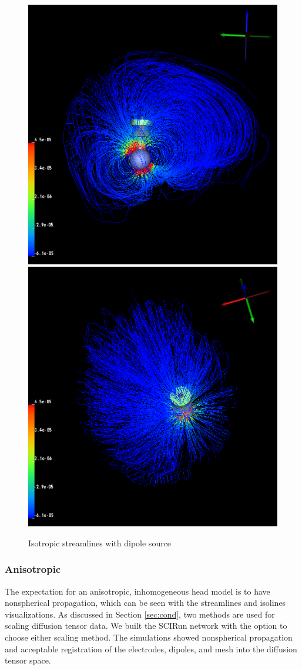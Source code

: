 \begin{figure}[H]
\begin{center}
\includegraphics[width=.49\textwidth]{Figures/iso_streamlines}
\includegraphics[width=.49\textwidth]{Figures/iso_streamlines_top}
\caption{Isotropic streamlines with dipole source}
\label{fig:isostream}
\end{center}
\end{figure}

\subsubsection{Anisotropic}

The expectation for an anisotropic, inhomogeneous head model is to have nonspherical propagation, which can be seen with the streamlines and isolines visualizations. As discussed in Section \ref{sec:cond}, two methods are used for scaling diffusion tensor data. We built the SCIRun network with the option to choose either scaling method. The simulations showed nonspherical propagation and acceptable registration of the electrodes, dipoles, and mesh into the diffusion tensor space.

